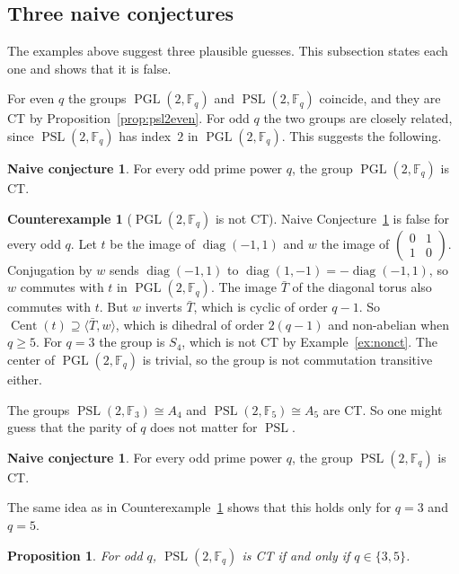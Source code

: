 \documentclass[12pt,letterpaper]{article}
\numberwithin{equation}{section}
\theoremstyle{plain}
\newtheorem{proposition}[theorem]{Proposition}
\theoremstyle{definition}
\newtheorem{counterexample}[theorem]{Counterexample}
\newtheorem{naiveconj}[theorem]{Naive conjecture}
\newcommand{\F}{\mathbb{F}}
\DeclareMathOperator{\Cent}{Cent}
\DeclareMathOperator{\PGL}{PGL}
\DeclareMathOperator{\PSL}{PSL}
\DeclareMathOperator{\diag}{diag}
\begin{document}
\subsection{Three naive conjectures}\label{sec:false}

The examples above suggest three plausible guesses. This subsection states
each one and shows that it is false.

For even $q$ the groups $\PGL(2,\F_q)$ and $\PSL(2,\F_q)$ coincide, and they
are CT by Proposition~\ref{prop:psl2even}. For odd $q$ the two groups are
closely related, since $\PSL(2,\F_q)$ has index~$2$ in $\PGL(2,\F_q)$. This
suggests the following.

\begin{naiveconj}\label{conj:pgl}
For every odd prime power $q$, the group $\PGL(2,\F_q)$ is CT.
\end{naiveconj}

\begin{counterexample}[$\PGL(2,\F_q)$ is not CT]\label{cex:pgl}
Naive Conjecture~\ref{conj:pgl} is false for every odd $q$. Let $t$ be the image of $\diag(-1,1)$ and $w$ the image
of $\left(\begin{smallmatrix}0&1\\1&0\end{smallmatrix}\right)$. Conjugation
by $w$ sends $\diag(-1,1)$ to $\diag(1,-1)=-\diag(-1,1)$, so $w$ commutes
with $t$ in $\PGL(2,\F_q)$. The image $\bar T$ of the diagonal torus also
commutes with $t$. But $w$ inverts $\bar T$, which is cyclic of order
$q-1$. So $\Cent(t)\supseteq\langle\bar T,w\rangle$, which is dihedral of
order $2(q-1)$ and non-abelian when $q\ge5$. For $q=3$ the group is $S_4$,
which is not CT by Example~\ref{ex:nonct}. The center of $\PGL(2,\F_q)$ is
trivial, so the group is not commutation transitive either.
\end{counterexample}

The groups $\PSL(2,\F_3)\cong A_4$ and $\PSL(2,\F_5)\cong A_5$ are CT. So
one might guess that the parity of $q$ does not matter for $\PSL$.

\begin{naiveconj}\label{conj:psl}
For every odd prime power $q$, the group $\PSL(2,\F_q)$ is CT.
\end{naiveconj}

The same idea as in Counterexample~\ref{cex:pgl} shows that this holds only
for $q=3$ and $q=5$.

\begin{proposition}\label{prop:psl2odd}
For odd $q$, $\PSL(2,\F_q)$ is CT if and only if $q\in\{3,5\}$.
\end{proposition}
\end{document}
